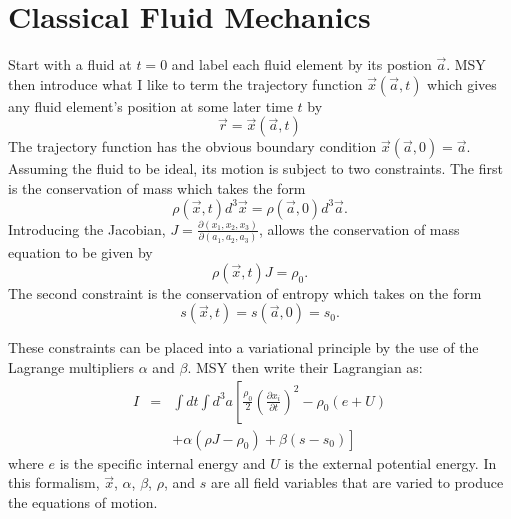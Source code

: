 \section{Classical Fluid Mechanics}\label{cfm}
Start with a fluid at $t=0$ and label each fluid element by its postion ${\vec a}$.  MSY then introduce what I like to term the trajectory function ${\vec x}({\vec a},t)$ which gives any fluid element's position at some later time $t$ by
\begin{equation}
{\vec r} = {\vec x}({\vec a},t)
\end{equation}
The trajectory function has the obvious boundary condition ${\vec x}({\vec a},0) = {\vec a}$.  Assuming the fluid to be ideal, its motion is subject to two constraints.  The first is the conservation of mass which takes the form
\begin{equation}
\rho ({\vec x},t) d^3 {\vec x} = \rho({\vec a},0) d^3 {\vec a}.
\end{equation}
Introducing the Jacobian, $J = \frac{\partial(x_1,x_2,x_3)}{\partial(a_1,a_2,a_3)}$, allows the conservation of mass equation to be given by
\begin{equation}
\rho({\vec x},t) J = \rho_0.
\end{equation}
The second constraint is the conservation of entropy which takes on the form
\begin{equation}
s({\vec x},t) = s({\vec a},0) = s_0.
\end{equation}

These constraints can be placed into a variational principle by the use of the Lagrange multipliers $\alpha$ and $\beta$.  MSY then write their Lagrangian as:
\begin{eqnarray}
I & = & \int dt \int d^3a \left[\frac{\rho_0}{2} \left( \frac{\partial x_i}{\partial t}\right)^2 - \rho_0(e+U) \right. \nonumber \\
& & + \left. \alpha (\rho J - {\rho}_0) + \beta (s - s_0) \right]
\end{eqnarray}
where $e$ is the specific internal energy and $U$ is the external potential energy.  In this formalism, ${\vec x}$, $\alpha$, $\beta$, $\rho$, and $s$ are all field variables that are varied to produce the equations of motion.

